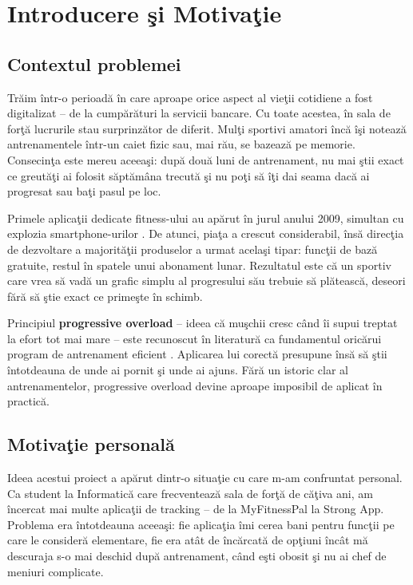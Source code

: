 \chapter{Introducere \c si Motiva\c tie}

\section{Contextul problemei}

Tr\u aim \^ intr-o perioad\u a \^ in care aproape orice aspect al vie\c tii
cotidiene a fost digitalizat -- de la cump\u ar\u aturi la servicii bancare.
Cu toate acestea, \^ in sala de for\c t\u a lucrurile stau surprinz\u ator de
diferit. Mul\c ti sportivi amatori \^ inc\u a \^ i\c si noteaz\u a
antrenamentele \^ intr-un caiet fizic sau, mai r\u au, se bazeaz\u a pe
memorie. Consecin\c ta este mereu aceea\c si: dup\u a dou\u a luni de
antrenament, nu mai \c stii exact ce greut\u a\c ti ai folosit s\u apt\u am\^ ana
trecut\u a \c si nu po\c ti s\u a \^ i\c ti dai seama dac\u a ai progresat sau
ba\c ti pasul pe loc.

Primele aplica\c tii dedicate fitness-ului au ap\u arut \^ in jurul anului
2009, simultan cu explozia smartphone-urilor \cite{grandview2023fitness}.
De atunci, pia\c ta a crescut considerabil, \^ ins\u a direc\c tia de
dezvoltare a majorit\u a\c tii produselor a urmat acela\c si tipar:
func\c tii de baz\u a gratuite, restul \^ in spatele unui abonament lunar.
Rezultatul este c\u a un sportiv care vrea s\u a vad\u a un grafic simplu al
progresului s\u au trebuie s\u a pl\u ateasc\u a, deseori f\u ar\u a s\u a
\c stie exact ce prime\c ste \^ in schimb.

Principiul \textbf{progressive overload} -- ideea c\u a mu\c schii cresc
c\^ and \^ ii supui treptat la efort tot mai mare -- este recunoscut \^ in
literatur\u a ca fundamentul oric\u arui program de antrenament eficient
\cite{zatsiorsky2006science}. Aplicarea lui corect\u a presupune \^ ins\u a
s\u a \c stii \^ intotdeauna de unde ai pornit \c si unde ai ajuns. F\u ar\u a
un istoric clar al antrenamentelor, progressive overload devine aproape
imposibil de aplicat \^ in practic\u a.

\section{Motiva\c tie personal\u a}

Ideea acestui proiect a ap\u arut dintr-o situa\c tie cu care m-am
confruntat personal. Ca student la Informatic\u a care frecventeaz\u a
sala de for\c t\u a de c\u a\c tiva ani, am \^ incercat mai multe aplica\c tii
de tracking -- de la MyFitnessPal la Strong App. Problema era \^ intotdeauna
aceea\c si: fie aplica\c tia \^ imi cerea bani pentru func\c tii pe care le
consider\u a elementare, fie era at\^ at de \^ inc\u arcat\u a de op\c tiuni
\^ inc\^ at m\u a descuraja s-o mai deschid dup\u a antrenament, c\^ and e\c sti
obosit \c si nu ai chef de meniuri complicate.

